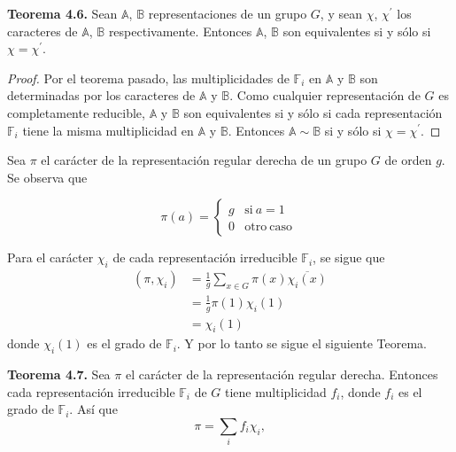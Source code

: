 \documentclass[12pt]{book}
\theoremstyle{definition}
\newcounter{in}
\begin{document}
\textbf{Teorema 4.6. } Sean $\mathbb{A}$, $\mathbb{B}$
representaciones de un grupo $G$, y sean $\chi$, $\chi^{'}$ los
caracteres de $\mathbb{A}$, $\mathbb{B}$ respectivamente. Entonces
$\mathbb{A}$, $\mathbb{B}$ son equivalentes si y sólo si
$\chi=\chi^{'}$.

\begin{proof}
  Por el teorema pasado, las multiplicidades de $\mathbb{F}_{i}$ en
  $\mathbb{A}$ y $\mathbb{B}$ son determinadas por los caracteres de
  $\mathbb{A}$ y $\mathbb{B}$. Como cualquier representación de $G$ es
  completamente reducible, $\mathbb{A}$ y $\mathbb{B}$ son
  equivalentes si y sólo si cada representación $\mathbb{F}_{i}$ tiene
  la misma multiplicidad en $\mathbb{A}$ y $\mathbb{B}$. Entonces
  $\mathbb{A} \sim \mathbb{B}$ si y sólo si $\chi=\chi^{'}$.
\end{proof}

Sea $\pi$ el carácter de la representación regular derecha de un grupo
$G$ de orden $g$. Se observa que

\begin{equation*} \label{PR}
         \pi(a) = \left\{
	       \begin{array}{ll}
		 g      & \mathrm{si\ } a = 1 \\
		 0      & \mathrm{otro\ caso\ } 
	       \end{array}
	     \right.
\end{equation*}

Para el carácter $\chi_{i}$ de cada representación irreducible
$\mathbb{F}_{i}$, se sigue que
\begin{equation*}
  \begin{aligned}
    (\pi,\chi_{i}) & =\frac{1}{g} \sum_{x \in G} \pi(x) \overline{\chi_{i}(x)} \\
    &=\frac{1}{g} \pi(1) \chi_{i}(1) \\
    &=\chi_{i}(1) 
  \end{aligned}
\end{equation*}
donde $\chi_{i}(1)$ es el grado de $\mathbb{F}_{i}$. Y por lo tanto se
sigue el siguiente Teorema.

\textbf{Teorema 4.7.} Sea $\pi$ el carácter de la representación
regular derecha. Entonces cada representación irreducible
$\mathbb{F}_{i}$ de $G$ tiene multiplicidad $f_{i}$, donde $f_{i}$ es
el grado de $\mathbb{F}_{i}$. Así que
\begin{equation*}
  \pi=\sum_{i} f_{i} \chi_{i},
\end{equation*}
\end{document}
